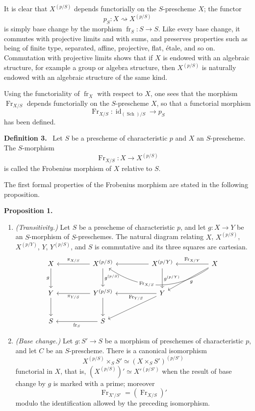 \documentclass[11pt]{article}
\newenvironment{statement}[1]{\par\medskip\noindent\textbf{#1.}\ }{\par\medskip}
\providecommand{\id}{\operatorname{id}}
\providecommand{\id}{\operatorname{id}}
\providecommand{\id}{\operatorname{id}}
\providecommand{\id}{\operatorname{id}}
\providecommand{\id}{\operatorname{id}}
\providecommand{\fr}{\operatorname{fr}}
\providecommand{\Fr}{\operatorname{Fr}}
\providecommand{\Sch}{\operatorname{Sch}}
\providecommand{\Fr}{\operatorname{Fr}}
\providecommand{\fr}{\operatorname{fr}}
\providecommand{\Sch}{\operatorname{Sch}}
\providecommand{\id}{\operatorname{id}}
\begin{document}
It is clear that $X^{(p/S)}$ depends functorially on the $S$-prescheme $X$; the functor
\[
p_S:X\rightsquigarrow X^{(p/S)}
\]
is simply base change by the morphism $\fr_S:S\to S$. Like every base change, it commutes with projective limits and with sums, and preserves properties such as being of finite type, separated, affine, projective, flat, étale, and so on. Commutation with projective limits shows that if $X$ is endowed with an algebraic structure, for example a group or algebra structure, then $X^{(p/S)}$ is naturally endowed with an algebraic structure of the same kind.

Using the functoriality of $\fr_X$ with respect to $X$, one sees that the morphism $\Fr_{X/S}$ depends functorially on the $S$-prescheme $X$, so that a functorial morphism
\[
\Fr_{X/S}:\id_{(\Sch)/S}\longrightarrow p_S
\]
has been defined.

\begin{statement}{Definition 3}
Let $S$ be a prescheme of characteristic $p$ and $X$ an $S$-prescheme. The $S$-morphism
\[
\Fr_{X/S}:X\longrightarrow X^{(p/S)}
\]
is called the Frobenius morphism of $X$ relative to $S$.
\end{statement}

The first formal properties of the Frobenius morphism are stated in the following proposition.

\begin{statement}{Proposition 1}
\begin{enumerate}[label=\alph*)]
\item \emph{(Transitivity.)} Let $S$ be a prescheme of characteristic $p$, and let $g:X\to Y$ be an $S$-morphism of $S$-preschemes. The natural diagram relating $X$, $X^{(p/S)}$, $X^{(p/Y)}$, $Y$, $Y^{(p/S)}$, and $S$ is commutative and its three squares are cartesian.
\[
\begin{tikzcd}[column sep=huge,row sep=large]
X \arrow[d,"g"'] & X^{(p/S)} \arrow[l,"\pi_{X/S}"'] \arrow[d,"g^{(p/S)}"] & X^{(p/Y)} \arrow[l] \arrow[d,"g^{(p/Y)}"] & X \arrow[l,"\Fr_{X/Y}"'] \arrow[ll,bend left=35,"\Fr_{X/S}"{description,pos=0.62}] \arrow[dl,"g"] \\
Y \arrow[d] & Y^{(p/S)} \arrow[l,"\pi_{Y/S}"] \arrow[d] & Y \arrow[l,"\Fr_{Y/S}"] \arrow[dl] & {} \\
S & S \arrow[l,"\fr_S"] & {} & {}
\end{tikzcd}
\]

\item \emph{(Base change.)} Let $g:S'\to S$ be a morphism of preschemes of characteristic $p$, and let $C$ be an $S$-prescheme. There is a canonical isomorphism
\[
X^{(p/S)}\times_S S'\simeq (X\times_S S')^{(p/S')}
\]
functorial in $X$, that is, $(X^{(p/S)})'\simeq X'{}^{(p/S')}$ when the result of base change by $g$ is marked with a prime; moreover
\[
\Fr_{X'/S'}=(\Fr_{X/S})'
\]
modulo the identification allowed by the preceding isomorphism.
\end{enumerate}
\end{statement}
\end{document}
